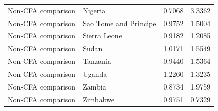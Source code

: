 \begin{table}
\begin{tabular}[t]{llrr}
Non-CFA comparison & Nigeria & 0.7068 & 3.3362\\
Non-CFA comparison & Sao Tome and Principe & 0.9752 & 1.5004\\
Non-CFA comparison & Sierra Leone & 0.9182 & 1.2085\\
\addlinespace
Non-CFA comparison & Sudan & 1.0171 & 1.5549\\
Non-CFA comparison & Tanzania & 0.9440 & 1.5364\\
Non-CFA comparison & Uganda & 1.2260 & 1.3235\\
Non-CFA comparison & Zambia & 0.8734 & 1.9759\\
Non-CFA comparison & Zimbabwe & 0.9751 & 0.7329\\
\bottomrule
\end{tabular}
\end{table}